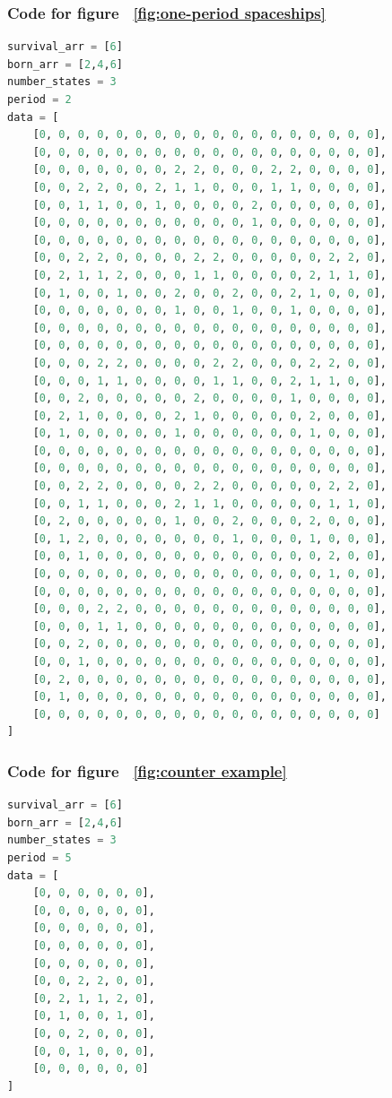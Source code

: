 \documentclass[12pt]{article}
\numberwithin{figure}{section} %
\begin{document}
\subsubsection{Code for figure ~\ref{fig:one-period spaceships}}
\label{subsubsection:one-period spaceships}
\begin{lstlisting}[language = Python]
survival_arr = [6]
born_arr = [2,4,6]
number_states = 3
period = 2
data = [
    [0, 0, 0, 0, 0, 0, 0, 0, 0, 0, 0, 0, 0, 0, 0, 0, 0, 0],
    [0, 0, 0, 0, 0, 0, 0, 0, 0, 0, 0, 0, 0, 0, 0, 0, 0, 0],
    [0, 0, 0, 0, 0, 0, 0, 2, 2, 0, 0, 0, 2, 2, 0, 0, 0, 0],
    [0, 0, 2, 2, 0, 0, 2, 1, 1, 0, 0, 0, 1, 1, 0, 0, 0, 0],
    [0, 0, 1, 1, 0, 0, 1, 0, 0, 0, 0, 2, 0, 0, 0, 0, 0, 0],
    [0, 0, 0, 0, 0, 0, 0, 0, 0, 0, 0, 1, 0, 0, 0, 0, 0, 0],
    [0, 0, 0, 0, 0, 0, 0, 0, 0, 0, 0, 0, 0, 0, 0, 0, 0, 0],
    [0, 0, 2, 2, 0, 0, 0, 0, 2, 2, 0, 0, 0, 0, 0, 2, 2, 0],
    [0, 2, 1, 1, 2, 0, 0, 0, 1, 1, 0, 0, 0, 0, 2, 1, 1, 0],
    [0, 1, 0, 0, 1, 0, 0, 2, 0, 0, 2, 0, 0, 2, 1, 0, 0, 0],
    [0, 0, 0, 0, 0, 0, 0, 1, 0, 0, 1, 0, 0, 1, 0, 0, 0, 0],
    [0, 0, 0, 0, 0, 0, 0, 0, 0, 0, 0, 0, 0, 0, 0, 0, 0, 0],
    [0, 0, 0, 0, 0, 0, 0, 0, 0, 0, 0, 0, 0, 0, 0, 0, 0, 0],
    [0, 0, 0, 2, 2, 0, 0, 0, 0, 2, 2, 0, 0, 0, 2, 2, 0, 0],
    [0, 0, 0, 1, 1, 0, 0, 0, 0, 1, 1, 0, 0, 2, 1, 1, 0, 0],
    [0, 0, 2, 0, 0, 0, 0, 0, 2, 0, 0, 0, 0, 1, 0, 0, 0, 0],
    [0, 2, 1, 0, 0, 0, 0, 2, 1, 0, 0, 0, 0, 0, 2, 0, 0, 0],
    [0, 1, 0, 0, 0, 0, 0, 1, 0, 0, 0, 0, 0, 0, 1, 0, 0, 0],
    [0, 0, 0, 0, 0, 0, 0, 0, 0, 0, 0, 0, 0, 0, 0, 0, 0, 0],
    [0, 0, 0, 0, 0, 0, 0, 0, 0, 0, 0, 0, 0, 0, 0, 0, 0, 0],
    [0, 0, 2, 2, 0, 0, 0, 0, 2, 2, 0, 0, 0, 0, 0, 2, 2, 0],
    [0, 0, 1, 1, 0, 0, 0, 2, 1, 1, 0, 0, 0, 0, 0, 1, 1, 0],
    [0, 2, 0, 0, 0, 0, 0, 1, 0, 0, 2, 0, 0, 0, 2, 0, 0, 0],
    [0, 1, 2, 0, 0, 0, 0, 0, 0, 0, 1, 0, 0, 0, 1, 0, 0, 0],
    [0, 0, 1, 0, 0, 0, 0, 0, 0, 0, 0, 0, 0, 0, 0, 2, 0, 0],
    [0, 0, 0, 0, 0, 0, 0, 0, 0, 0, 0, 0, 0, 0, 0, 1, 0, 0],
    [0, 0, 0, 0, 0, 0, 0, 0, 0, 0, 0, 0, 0, 0, 0, 0, 0, 0],   
    [0, 0, 0, 2, 2, 0, 0, 0, 0, 0, 0, 0, 0, 0, 0, 0, 0, 0],
    [0, 0, 0, 1, 1, 0, 0, 0, 0, 0, 0, 0, 0, 0, 0, 0, 0, 0],
    [0, 0, 2, 0, 0, 0, 0, 0, 0, 0, 0, 0, 0, 0, 0, 0, 0, 0],
    [0, 0, 1, 0, 0, 0, 0, 0, 0, 0, 0, 0, 0, 0, 0, 0, 0, 0],
    [0, 2, 0, 0, 0, 0, 0, 0, 0, 0, 0, 0, 0, 0, 0, 0, 0, 0],
    [0, 1, 0, 0, 0, 0, 0, 0, 0, 0, 0, 0, 0, 0, 0, 0, 0, 0],
    [0, 0, 0, 0, 0, 0, 0, 0, 0, 0, 0, 0, 0, 0, 0, 0, 0, 0]
]
\end{lstlisting}
\noindent\begin{minipage}{.45\textwidth}
\subsubsection{Code for figure ~\ref{fig:counter example}}
\label{subsubsection:counter example}
\begin{lstlisting}[language = Python]
survival_arr = [6]
born_arr = [2,4,6]
number_states = 3
period = 5
data = [
    [0, 0, 0, 0, 0, 0],
    [0, 0, 0, 0, 0, 0],
    [0, 0, 0, 0, 0, 0],
    [0, 0, 0, 0, 0, 0],
    [0, 0, 0, 0, 0, 0],
    [0, 0, 2, 2, 0, 0], 
    [0, 2, 1, 1, 2, 0], 
    [0, 1, 0, 0, 1, 0], 
    [0, 0, 2, 0, 0, 0], 
    [0, 0, 1, 0, 0, 0], 
    [0, 0, 0, 0, 0, 0]
]
\end{lstlisting}
\end{minipage}
\end{document}
